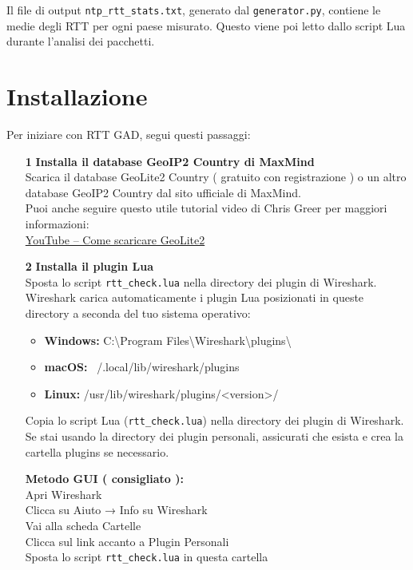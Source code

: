 Il file di output \texttt{ntp\_rtt\_stats.txt}, generato dal \texttt{generator.py}, contiene le medie degli RTT per ogni paese misurato. Questo viene poi letto dallo script Lua durante l'analisi dei pacchetti.\\

\section{Installazione}

Per iniziare con RTT GAD, segui questi passaggi:

\begin{enumerate}
  \item[\textbf{1}] \textbf{Installa il database GeoIP2 Country di MaxMind} \\
  Scarica il database GeoLite2 Country ( gratuito con registrazione ) o un altro database GeoIP2 Country dal sito ufficiale di MaxMind.\\

  Puoi anche seguire questo utile tutorial video di Chris Greer per maggiori informazioni: \\
  \href{https://www.youtube.com/watch?v=some-video-id}{YouTube – Come scaricare GeoLite2}
  
  \item[\textbf{2}] \textbf{Installa il plugin Lua} \\
  Sposta lo script \texttt{rtt\_check.lua} nella directory dei plugin di Wireshark. Wireshark carica automaticamente i plugin Lua posizionati in queste directory a seconda del tuo sistema operativo:
  
  \begin{itemize}
    \item \textbf{Windows:} C:\textbackslash Program Files\textbackslash Wireshark\textbackslash plugins\textbackslash 
    \item \textbf{macOS:} ~/.local/lib/wireshark/plugins
    \item \textbf{Linux:} /usr/lib/wireshark/plugins/<version>/
  \end{itemize}
  
  Copia lo script Lua (\texttt{rtt\_check.lua}) nella directory dei plugin di Wireshark. Se stai usando la directory dei plugin personali, assicurati che esista e crea la cartella plugins se necessario.
  
  \textbf{Metodo GUI ( consigliato ):} \\
  Apri Wireshark \\
  Clicca su Aiuto → Info su Wireshark \\
  Vai alla scheda Cartelle \\
  Clicca sul link accanto a Plugin Personali \\
  Sposta lo script \texttt{rtt\_check.lua} in questa cartella
  

\end{enumerate}
